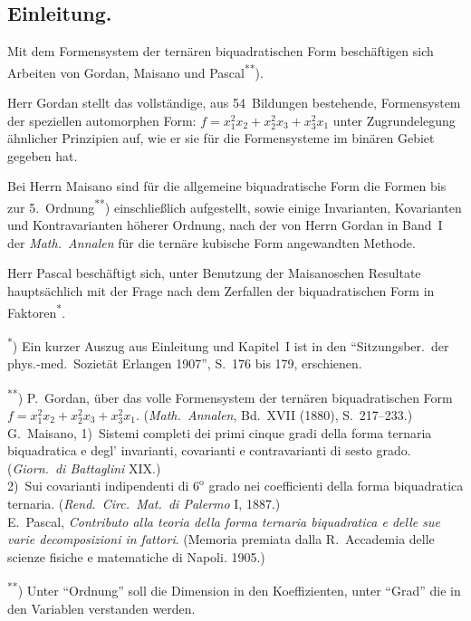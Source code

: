 \documentclass[11pt,a4paper]{article}
\theoremstyle{plain}
\theoremstyle{definition}
\begin{document}
\subsection*{Einleitung.}

Mit dem Formensystem der tern\"aren biquadratischen Form besch\"aftigen sich Arbeiten von Gordan, Maisano und Pascal\textsuperscript{**}).

Herr Gordan stellt das vollst\"andige, aus 54~Bildungen bestehende, Formensystem der speziellen automorphen Form: $f = x_1^2 x_2 + x_2^2 x_3 + x_3^2 x_1$ unter Zugrundelegung \"ahnlicher Prinzipien auf, wie er sie f\"ur die Formensysteme im bin\"aren Gebiet gegeben hat.

Bei Herrn Maisano sind f\"ur die allgemeine biquadratische Form die Formen bis zur 5.~Ordnung\textsuperscript{**}) einschlie\ss lich aufgestellt, sowie einige Invarianten, Kovarianten und Kontravarianten h\"oherer Ordnung, nach der von Herrn Gordan in Band~I der \textit{Math.~Annalen} f\"ur die tern\"are kubische Form angewandten Methode.

Herr Pascal besch\"aftigt sich, unter Benutzung der Maisanoschen Resultate haupts\"achlich mit der Frage nach dem Zerfallen der biquadratischen Form in Faktoren\textsuperscript{*}.

\vspace{0.3cm}
\begin{footnotesize}
\noindent\textsuperscript{*}) Ein kurzer Auszug aus Einleitung und Kapitel~I ist in den ``Sitzungsber.~der phys.-med.~Soziet\"at Erlangen 1907'', S.~176 bis 179, erschienen.

\noindent\textsuperscript{**}) P.~Gordan, \"uber das volle Formensystem der tern\"aren biquadratischen Form $f = x_1^2 x_2 + x_2^2 x_3 + x_3^2 x_1$. (\textit{Math.~Annalen}, Bd.~XVII (1880), S.~217--233.)\\
G.~Maisano, 1)~Sistemi completi dei primi cinque gradi della forma ternaria biquadratica e degl' invarianti, covarianti e contravarianti di sesto grado. (\textit{Giorn.~di Battaglini} XIX.)\\
\hspace*{2em}2)~Sui covarianti indipendenti di $6^{\mathrm{o}}$ grado nei coefficienti della forma biquadratica ternaria. (\textit{Rend.~Circ.~Mat.~di Palermo} I, 1887.)\\
E.~Pascal, \textit{Contributo alla teoria della forma ternaria biquadratica e delle sue varie decomposizioni in fattori}. (Memoria premiata dalla R.~Accademia delle scienze fisiche e matematiche di Napoli. 1905.)

\noindent\textsuperscript{**}) Unter ``Ordnung'' soll die Dimension in den Koeffizienten, unter ``Grad'' die in den Variablen verstanden werden.
\end{footnotesize}
\end{document}
